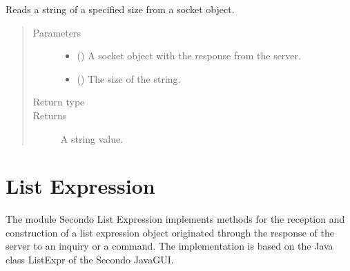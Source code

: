 \documentclass[letterpaper,10pt,english]{sphinxmanual}
\begin{document}
\begin{fulllineitems}
\label{\detokenize{index:secondodb.api.support.secondoinputhandler.read_string}}
Reads a string of a specified size from a socket object.
\begin{quote}\begin{description}
\item[{Parameters}] \leavevmode\begin{itemize}
\item {} 
 () \textendash{} A socket object with the response from the  server.

\item {} 
 () \textendash{} The size of the string.

\end{itemize}

\item[{Return type}] \leavevmode
{}

\item[{Returns}] \leavevmode
A string value.

\end{description}\end{quote}

\end{fulllineitems}



\section{ List Expression}
\label{\detokenize{index:module-secondodb.api.support.secondolistexpr}}\label{\detokenize{index:sec-list-expression}}
The module Secondo List Expression implements methods for the reception and construction of a list expression object
originated through the response of the  server to an inquiry or a command. The implementation is based on the
Java class ListExpr of the Secondo JavaGUI.
\end{document}
